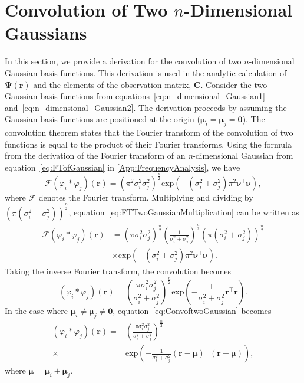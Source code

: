 \documentclass[review,authoryear,3p]{elsarticle}
\begin{document}
\section{Convolution of Two $n$-Dimensional Gaussians}\label{ap:ConvOfGaussians}
In this section, we provide a derivation for the convolution of two $n$-dimensional Gaussian basis functions. This derivation is used in the analytic calculation of $\boldsymbol\Psi(\mathbf{r})$ and the elements of the observation matrix, $\mathbf C$. Consider the two Gaussian basis functions from equations~\ref{eq:n_dimensional_Gaussian1} and~\ref{eq:n_dimensional_Gaussian2}. The derivation proceeds by assuming the Gaussian basis functions are positioned at the origin ($\boldsymbol\mu_i=\boldsymbol\mu_j=\mathbf 0$). The convolution theorem states that the Fourier transform of the convolution of two functions is equal to the product of their Fourier transforms. Using the formula from the derivation of the Fourier transform of an \emph{n}-dimensional Gaussian from equation~\ref{eq:FTofGaussian} in \ref{App:FrequencyAnalysis}, we have
\begin{equation}\label{eq:FTTwoGaussianMultiplication}
\mathcal{F}\left(\varphi_i*\varphi_j\right)(\mathbf{r}) = \left(\pi^2\sigma_i^2\sigma_j^2\right)^{\frac{n}{2}}\mathrm{exp}\left(-(\sigma_i^2+\sigma_j^2)\pi^2\boldsymbol\nu^\top\boldsymbol\nu\right),
\end{equation}
where $\mathcal{F}$ denotes the Fourier transform. Multiplying and dividing by $\left(\pi\left(\sigma_i^2+\sigma_j^2\right)\right)^{\frac{n}{2}}$, equation~\ref{eq:FTTwoGaussianMultiplication} can be written as 
\begin{align}
\mathcal{F}\left(\varphi_i*\varphi_j\right)(\mathbf{r})&=\left(\pi\sigma_i^2\sigma_j^2\right)^{\frac{n}{2}}\left(\frac{1}{\sigma_i^2+\sigma_j^2}\right)^{\frac{n}{2}} (\pi(\sigma_i^2+\sigma_j^2))^{\frac{n}{2}} \nonumber \\
 &\times\mathrm{exp}\left(-(\sigma_i^2+\sigma_j^2)\pi^2\boldsymbol\nu^\top\boldsymbol\nu\right).
\end{align}
Taking the inverse Fourier transform, the convolution becomes
\begin{equation}\label{eq:ConvoftwoGaussian}
 \left(\varphi_i*\varphi_j\right)(\mathbf{r}) = \left(\frac{\pi\sigma_i^2\sigma_j^2}{\sigma_i^2+\sigma_j^2}\right)^{\frac{n}{2}}\mathrm{exp}\left({-\frac{1}{\sigma_i^2+\sigma_j^2} \mathbf r^\top\mathbf r}\right).
\end{equation}
In the case where $\boldsymbol\mu_i\neq\boldsymbol\mu_j\neq\mathbf 0$, equation~\ref{eq:ConvoftwoGaussian} becomes
\begin{align}\label{eq:ConvoftwoGaussianNonzeroMean}
 \left(\varphi_i*\varphi_j\right)(\mathbf{r}) =& \left( \frac{\pi\sigma_i^2\sigma_j^2} {\sigma_i^2+\sigma_j^2}\right)^{\frac{n}{2}}\nonumber \\
\times & \mathrm{exp}\left({-\frac{1}{\sigma_i^2+\sigma_j^2} (\mathbf r-\boldsymbol\mu)^\top(\mathbf r-\boldsymbol\mu)}\right),
\end{align}
where $\boldsymbol\mu=\boldsymbol\mu_i+\boldsymbol\mu_j$.
\end{document}

